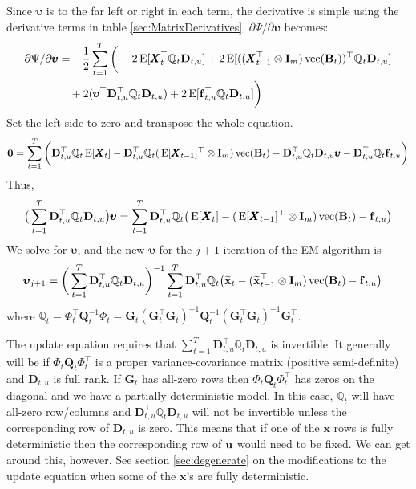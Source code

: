 \documentclass[]{article}
\def\uupsilon{\pmb{\upsilon}}
\def\UPS{\mbox{\boldmath $\Upsilon$}}
\def\BB{\mbox{$\mathbf B$}}	\def\bb{\mbox{$\mathbf b$}} \def\Bb{\mbox{$\mathbf J$}} \def\Ba{\mbox{$\mathbf L$}} \def\Bm{\UPS}
\def\DD{\mbox{$\mathbf D$}}	\def\dd{\mbox{$\mathbf d$}}
\def\E{\,\textup{\textrm{E}}}
\def\GG{\mbox{$\mathbf G$}}	\def\gg{\mbox{$\mathbf g$}}
\def\II{\mbox{$\mathbf I$}} \def\ii{\mbox{$\mathbf i$}}
\def\QQ{\mbox{$\mathbf Q$}}	 \def\qq{\mbox{$\mathbf q$}} \def\Qb{\mbox{$\mathbf G$}}  \def\Qm{\mathbb{Q}}
\def\XX{\mbox{$\pmb{X}$}}	\def\xx{\mbox{$\pmb{x}$}}
\def\vec{\,\textup{\textrm{vec}}}
\def\hatxt{\widetilde{\mbox{$\mathbf x$}}_t}
\def\hatxtm{\widetilde{\mbox{$\mathbf x$}}_{t-1}}
\begin{document}
Since $\uupsilon$ is to the far left or right in each term, the derivative is simple using the derivative terms in table \ref{sec:MatrixDerivatives}.
$\partial\Psi/\partial\pmb{\upsilon}$ becomes:
\begin{equation}\label{eq:u.general1b}
\begin{split}
\partial\Psi/\partial\pmb{\upsilon}
&= - \frac{1}{2}\sum_{t=1}^T \bigg(  
-2\E[\XX_t^\top\Qm_t\DD_{t,u}] +  2\E[(( \XX_{t-1}^\top \otimes \II_m)\vec(\BB_t))^\top \Qm_t\DD_{t,u}] \\
&\quad + 2(\uupsilon^\top\DD_{t,u}^\top\Qm_t\DD_{t,u}) + 2\E[ \ff_{t,u}^\top\Qm_t\DD_{t,u} ] \bigg)
\end{split}\end{equation}
Set the left side to zero and transpose the whole equation. 
\begin{equation}\label{eq:u.general4}
\begin{split}
\mathbf{0}= \sum_{t=1}^T \bigg( \DD_{t,u}^\top\Qm_t\E[\XX_t] - \DD_{t,u}^\top\Qm_t(\E[\XX_{t-1}]^\top \otimes \II_m)\vec(\BB_t) 
- \DD_{t,u}^\top\Qm_t\DD_{t,u}\uupsilon
 - \DD_{t,u}^\top\Qm_t\ff_{t,u} \bigg)
\end{split}
\end{equation}
Thus,
\begin{equation}\label{eq:u.general5}
\big(\sum_{t=1}^T \DD_{t,u}^\top\Qm_t\DD_{t,u} \big)\uupsilon
 = \sum_{t=1}^T \DD_{t,u}^\top\Qm_t\big(\E[ \XX_t ]- (\E[\XX_{t-1}]^\top \otimes \II_m)\vec(\BB_t) - \ff_{t,u} \big)
\end{equation}
We solve for $\uupsilon$, and the new $\uupsilon$ for the $j+1$ iteration of the EM algorithm is
\begin{equation}\label{eq:u.general.update1}
\begin{split}
\uupsilon_{j+1} &= \bigg(\sum_{t=1}^T \DD_{t,u}^\top\Qm_t\DD_{t,u} \bigg)^{-1}
  \sum_{t=1}^T \DD_{t,u}^\top\Qm_t\big(\hatxt- (\hatxtm^\top \otimes \II_m)\vec(\BB_t) - \ff_{t,u} \big)
\end{split}
\end{equation}
where $\Qm_t = \Phi_t^\top\QQ_t^{-1}\Phi_t = \GG_t(\GG_t^\top\GG_t)^{-1}\QQ_t^{-1}(\GG_t^\top\GG_t)^{-1}\GG_t^\top$.

The update equation requires that $\sum_{t=1}^T \DD_{t,u}^\top\Qm_t\DD_{t,u}$ is invertible. It generally will be if $\Phi_t\QQ_t\Phi_t^\top$ is a proper variance-covariance matrix (positive semi-definite) and $\DD_{t,u}$ is full rank.  If $\GG_t$ has all-zero rows then $\Phi_t\QQ_t\Phi_t^\top$ has zeros on the diagonal and we have a partially deterministic model.  In this case, $\Qm_t$ will have all-zero row/columns and $\DD_{t,u}^\top\Qm_t\DD_{t,u}$ will not be invertible unless the corresponding row of $\DD_{t,u}$ is zero.  This means that if one of the $\xx$ rows is fully deterministic then the corresponding row of $\mbox{$\mathbf u$}$ would need to be fixed.  We can get around this, however.  See section \ref{sec:degenerate} on the modifications to the update equation when some of the $\xx$'s are fully deterministic.
\end{document}
